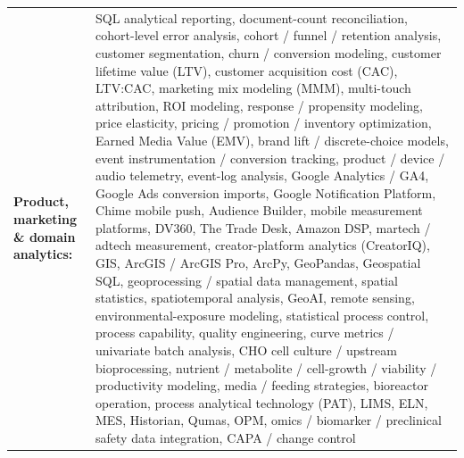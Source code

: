 \documentclass[letterpaper,11pt]{article}
\begin{document}
\par\vspace{2pt}
\begin{tabularx}{\linewidth}{@{}>{\raggedright\arraybackslash}p{1.8in}X@{}}
\textbf{Product, marketing \& domain analytics:} & \footnotesize{SQL analytical reporting, document-count reconciliation, cohort-level error analysis, cohort / funnel / retention analysis, customer segmentation, churn / conversion modeling, customer lifetime value (LTV), customer acquisition cost (CAC), LTV:CAC, marketing mix modeling (MMM), multi-touch attribution, ROI modeling, response / propensity modeling, price elasticity, pricing / promotion / inventory optimization, Earned Media Value (EMV), brand lift / discrete-choice models, event instrumentation / conversion tracking, product / device / audio telemetry, event-log analysis, Google Analytics / GA4, Google Ads conversion imports, Google Notification Platform, Chime mobile push, Audience Builder, mobile measurement platforms, DV360, The Trade Desk, Amazon DSP, martech / adtech measurement, creator-platform analytics (CreatorIQ), GIS, ArcGIS / ArcGIS Pro, ArcPy, GeoPandas, Geospatial SQL, geoprocessing / spatial data management, spatial statistics, spatiotemporal analysis, GeoAI, remote sensing, environmental-exposure modeling, statistical process control, process capability, quality engineering, curve metrics / univariate batch analysis, CHO cell culture / upstream bioprocessing, nutrient / metabolite / cell-growth / viability / productivity modeling, media / feeding strategies, bioreactor operation, process analytical technology (PAT), LIMS, ELN, MES, Historian, Qumas, OPM, omics / biomarker / preclinical safety data integration, CAPA / change control}\\
\end{tabularx}
\par\vspace{2pt}
\end{document}
